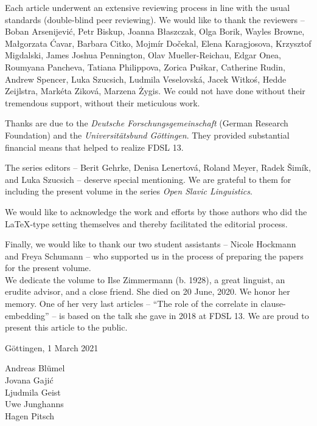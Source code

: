 \documentclass[output=paper,
colorlinks,
citecolor=brown,
newtxmath
]{langscibook}
\begin{document}
\begin{refsection}
Each article underwent an extensive reviewing process in line with the usual standards (double-blind peer reviewing). We would like to thank the reviewers -- Boban Arsenijević, Petr Biskup, Joanna Błaszczak, Olga Borik, Wayles Browne, Małgorzata Ćavar, Barbara Citko, Mojmír Dočekal, Elena Karagjosova, Krzysztof Migdalski, James Joshua Pennington, Olav Mueller-Reichau, Edgar Onea, Roum\-yana Pancheva, Tatiana Philippova, Zorica Puškar, Catherine Rudin, Andrew Spencer, Luka Szucsich, Ludmila Veselovská, Jacek Witkoś, Hedde Zeijlstra, \linebreak Markéta Ziková, Marzena Żygis. We could not have done without their tremendous support, without their meticulous work.

Thanks are due to the \textit{Deutsche Forschungsgemeinschaft} (German Research Foundation) and the \textit{Universitätsbund Göttingen}. They provided substantial financial means that helped to realize FDSL 13.

The series editors -- Berit Gehrke, Denisa Lenertová, Roland Meyer, Radek Šimík, and Luka Szucsich -- deserve special mentioning. We are grateful to them for including the present volume in the series \textit{Open Slavic Linguistics}.

We would like to acknowledge the work and efforts by those authors who did the \LaTeX-type setting themselves and thereby facilitated the editorial process.

Finally, we would like to thank our two student assistants -- Nicole Hockmann and Freya Schumann -- who supported us in the process of preparing the papers for the present volume.\\

\noindent We dedicate the volume to Ilse Zimmermann (b. 1928), a great linguist, an erudite advisor, and a close friend. She died on 20 June, 2020. We honor her memory. One of her very last articles – ``The role of the correlate in clause-embedding'' – is based on the talk she gave in 2018 at FDSL 13. We are proud to present this article to the public.

\null\hfill Göttingen, 1 March 2021

\null\hfill Andreas Blümel\\
\null\hfill Jovana Gajić\\
\null\hfill Ljudmila Geist\\
\null\hfill Uwe Junghanns\\
\null\hfill Hagen Pitsch\\
\end{refsection}
\end{document}
